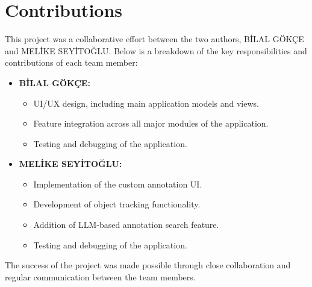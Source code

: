\chapter*{Contributions}

This project was a collaborative effort between the two authors, BİLAL GÖKÇE and MELİKE SEYİTOĞLU. Below is a breakdown of the key responsibilities and contributions of each team member:

\begin{itemize}
    \item \textbf{BİLAL GÖKÇE:}
    \begin{itemize}
        \item UI/UX design, including main application models and views.
        \item Feature integration across all major modules of the application.
        \item Testing and debugging of the application.
    \end{itemize}
    \item \textbf{MELİKE SEYİTOĞLU:}
    \begin{itemize}
        \item Implementation of the custom annotation UI.
        \item Development of object tracking functionality.
        \item Addition of LLM-based annotation search feature.
        \item Testing and debugging of the application.
    \end{itemize}
\end{itemize}

The success of the project was made possible through close collaboration and regular communication between the team members.
